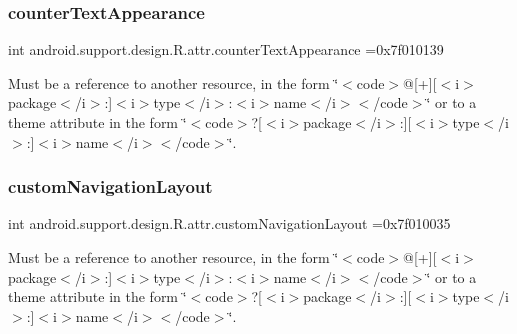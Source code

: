 \subsubsection{\texorpdfstring{counter\+Text\+Appearance}{counterTextAppearance}}
{\footnotesize\ttfamily int android.\+support.\+design.\+R.\+attr.\+counter\+Text\+Appearance =0x7f010139\hspace{0.3cm}{\ttfamily [static]}}

Must be a reference to another resource, in the form \char`\"{}$<$code$>$@\mbox{[}+\mbox{]}\mbox{[}$<$i$>$package$<$/i$>$\+:\mbox{]}$<$i$>$type$<$/i$>$\+:$<$i$>$name$<$/i$>$$<$/code$>$\char`\"{} or to a theme attribute in the form \char`\"{}$<$code$>$?\mbox{[}$<$i$>$package$<$/i$>$\+:\mbox{]}\mbox{[}$<$i$>$type$<$/i$>$\+:\mbox{]}$<$i$>$name$<$/i$>$$<$/code$>$\char`\"{}. \mbox{\label{classandroid_1_1support_1_1design_1_1R_1_1attr_a9d78ff9bcc69bcb05b0d75f4988d0db9}} 
\subsubsection{\texorpdfstring{custom\+Navigation\+Layout}{customNavigationLayout}}
{\footnotesize\ttfamily int android.\+support.\+design.\+R.\+attr.\+custom\+Navigation\+Layout =0x7f010035\hspace{0.3cm}{\ttfamily [static]}}

Must be a reference to another resource, in the form \char`\"{}$<$code$>$@\mbox{[}+\mbox{]}\mbox{[}$<$i$>$package$<$/i$>$\+:\mbox{]}$<$i$>$type$<$/i$>$\+:$<$i$>$name$<$/i$>$$<$/code$>$\char`\"{} or to a theme attribute in the form \char`\"{}$<$code$>$?\mbox{[}$<$i$>$package$<$/i$>$\+:\mbox{]}\mbox{[}$<$i$>$type$<$/i$>$\+:\mbox{]}$<$i$>$name$<$/i$>$$<$/code$>$\char`\"{}. \mbox{\label{classandroid_1_1support_1_1design_1_1R_1_1attr_a5abb1108b710be231b2aeea1142b9ca2}} 
